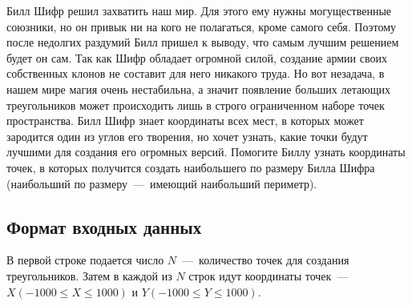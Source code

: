 \documentclass[12pt]{scrartcl}
\begin{document}
\begin{figure}[h]
\begin{minipage}[h]{0.3\linewidth}
\end{minipage}
\begin{minipage}[h]{0.3\linewidth}
\end{minipage}
\end{figure}


Билл Шифр решил захватить наш мир. Для этого ему нужны могущественные союзники, но он привык ни на кого не полагаться, кроме самого себя. Поэтому после недолгих раздумий Билл пришел к выводу, что самым лучшим решением будет он сам. Так как Шифр обладает огромной силой, создание армии своих собственных клонов не составит для него никакого труда. Но вот незадача, в нашем мире магия очень нестабильна, а значит появление больших летающих треугольников может происходить лишь в строго ограниченном наборе точек пространства. Билл Шифр знает координаты всех мест, в которых может зародится один из углов его творения, но хочет узнать, какие точки будут лучшими для создания его огромных версий. Помогите Биллу узнать координаты точек, в которых получится создать наибольшего по размеру Билла Шифра (наибольший по размеру~---~имеющий наибольший периметр). 

\subsection*{Формат входных данных}
В первой строке подается число  $N$~---~количество точек для создания треугольников. Затем в каждой из $N$ строк идут координаты точек~---~$X(-1000 \leq X \leq 1000)$ и $Y(-1000 \leq Y \leq 1000)$.
\end{document}
